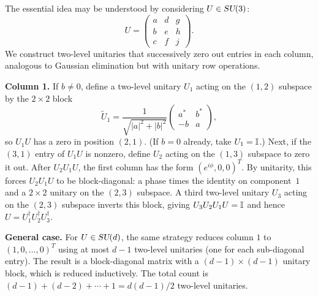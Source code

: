 The essential idea may be understood by considering $U \in \textsl{SU}(3)$:
\begin{equation}
  U = \begin{pmatrix}
    a & d & g \\
    b & e & h \\
    c & f & j
  \end{pmatrix}.
\end{equation}
We construct two-level unitaries that successively zero out entries in each
column, analogous to Gaussian elimination but with unitary row operations.

\textbf{Column 1.} If $b\neq 0$, define a two-level unitary $U_1$ acting
on the $(1,2)$ subspace by the $2\times 2$ block
\[
  \widetilde{U}_1 = \frac{1}{\sqrt{|a|^2+|b|^2}}
  \begin{pmatrix} a^* & b^* \\ -b & a \end{pmatrix},
\]
so $U_1 U$ has a zero in position $(2,1)$. (If $b=0$ already, take
$U_1=\mathbb{I}$.) Next, if the $(3,1)$ entry of $U_1 U$ is nonzero, define
$U_2$ acting on the $(1,3)$ subspace to zero it out.  After $U_2 U_1 U$,
the first column has the form $(e^{i\phi},0,0)^T$.  By unitarity, this
forces $U_2 U_1 U$ to be block-diagonal: a phase times the identity on
component~$1$ and a $2\times 2$ unitary on the $(2,3)$ subspace.  A third
two-level unitary $U_3$ acting on the $(2,3)$ subspace inverts this block,
giving $U_3 U_2 U_1 U = \mathbb{I}$ and hence
$U = U_1^\dagger U_2^\dagger U_3^\dagger$.

\textbf{General case.}
For $U\in\textsl{SU}(d)$, the same strategy reduces column $1$ to
$(1,0,\ldots,0)^T$ using at most $d-1$ two-level unitaries (one for each
sub-diagonal entry).  The result is a block-diagonal matrix with a
$(d-1)\times(d-1)$ unitary block, which is reduced inductively.  The total
count is $(d-1)+(d-2)+\cdots+1 = d(d-1)/2$ two-level unitaries.

